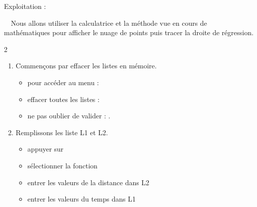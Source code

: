 \documentclass[11pt,a4paper]{article}
\begin{document}
 Exploitation : \\
\Calculatrice* 
\begin{minipage}{16cm}{
~~Nous allons utiliser la calculatrice et la méthode vue en cours de mathématiques pour afficher le nuage de points puis tracer la droite de régression. \\
\vspace{5mm}
}

\end{minipage}


    
\begin{multicols}{2}
\begin{enumerate}
    \item Commençons par effacer les listes en mémoire. \\
    
\begin{itemize}
\item pour accéder au menu :\\ \hspace{11pt}\Touche[style=second,  raise=-0.5ex]
    \Touche[style=operation, principal=+, second=mém,alpha=", raise=-0.5ex]
\item effacer toutes les listes :            \hspace{-25pt}
    \raisebox{-3pt}
    {}

\item ne pas oublier de valider : \Touche[style=enter,fontsize=7pt, 
principal=entrer, second=préc, 
alpha=résol, position=0.95, fontsize=7pt, raise=-1.5ex].

\end{itemize}



\item Remplissons les liste L1 et L2.\\
\begin{itemize}
    \vspace{0cm}
    \item appuyer sur \Touche[principal=stat, raise=-0.7ex]
    \item sélectionner la fonction 
    \hspace{-15pt}
    \raisebox{-3pt}
    {}
    \item entrer les valeurs de la distance dans L2
    \item entrer les valeurs du temps dans L1
\end{itemize}


\end{enumerate}
\end{multicols}
\end{document}
